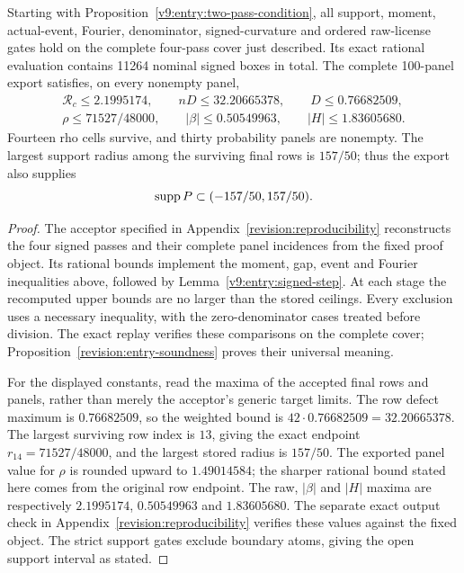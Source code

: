 \begin{proposition}\label{v9:entry:signed-condition}
Starting with Proposition~\ref{v9:entry:two-pass-condition}, all support,
moment, actual-event, Fourier, denominator, signed-curvature and ordered
raw-license gates hold on the complete four-pass cover just described.
Its exact rational evaluation contains 11264 nominal signed boxes in
total. The complete 100-panel export satisfies, on every nonempty panel,
\begin{gather*}
 \mathcal R_c\le2.1995174,\qquad nD\le32.20665378,
 \qquad D\le0.76682509,\\
 \rho\le71527/48000,
 \qquad |\beta|\le0.50549963,
 \qquad |H|\le1.83605680.
\end{gather*}
Fourteen rho cells survive, and thirty probability panels are nonempty.
The largest support radius among the surviving final rows is $157/50$;
thus the export also supplies
\begin{equation}\label{v9:entry:exported-support}
 \operatorname{supp} P\subset(-157/50,157/50).
\end{equation}
\end{proposition}
\begin{proof}
The acceptor specified in Appendix~\ref{revision:reproducibility}
reconstructs the four signed passes and their complete panel incidences
from the fixed proof object. Its rational bounds implement the moment,
gap, event and Fourier inequalities above, followed by
Lemma~\ref{v9:entry:signed-step}. At each stage the recomputed upper
bounds are no larger than the stored ceilings. Every exclusion uses
a necessary inequality, with the zero-denominator cases treated before
division. The exact replay verifies these comparisons on the complete
cover; Proposition~\ref{revision:entry-soundness} proves their universal
meaning.

For the displayed constants, read the maxima of the accepted final
rows and panels, rather than merely the acceptor's generic target
limits. The row defect maximum is $0.76682509$, so the weighted
bound is $42\cdot0.76682509=32.20665378$. The largest surviving
row index is $13$, giving the exact endpoint
$r_{14}=71527/48000$, and the largest stored radius is $157/50$.
The exported panel value for $\rho$ is rounded upward to $1.49014584$;
the sharper rational bound stated here comes from the original row
endpoint. The raw, $|\beta|$ and $|H|$ maxima are respectively
$2.1995174$, $0.50549963$ and $1.83605680$. The separate exact
output check in Appendix~\ref{revision:reproducibility} verifies these
values against the fixed object. The strict support gates exclude
boundary atoms, giving the open support interval as stated.
\end{proof}


